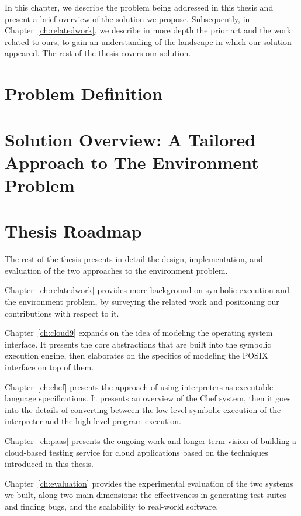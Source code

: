 In this chapter, we describe the problem being addressed in this thesis and present a brief overview of the solution we propose.
%
Subsequently, in Chapter~\ref{ch:relatedwork}, we describe in more depth the prior art and the work related to ours, to gain an understanding of the landscape in which our solution appeared.
%
The rest of the thesis covers our solution.

\section{Problem Definition}


\section{Solution Overview: A Tailored Approach to The Environment Problem}



\section{Thesis Roadmap}

The rest of the thesis presents in detail the design, implementation, and evaluation of the two approaches to the environment problem.

Chapter~\ref{ch:relatedwork} provides more background on symbolic execution and the environment problem, by surveying the related work and positioning our contributions with respect to it.

Chapter~\ref{ch:cloud9} expands on the idea of modeling the operating system interface.  It presents the core abstractions that are built into the symbolic execution engine, then elaborates on the specifics of modeling the POSIX interface on top of them.

Chapter~\ref{ch:chef} presents the approach of using interpreters as executable language specifications.  It presents an overview of the Chef system, then it goes into the details of converting between the low-level symbolic execution of the interpreter and the high-level program execution.

Chapter~\ref{ch:paas} presents the ongoing work and longer-term vision of building a cloud-based testing service for cloud applications based on the techniques introduced in this thesis.

Chapter~\ref{ch:evaluation} provides the experimental evaluation of the two systems we built, along two main dimensions: the effectiveness in generating test suites and finding bugs, and the scalability to real-world software.

